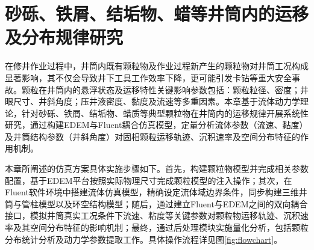 \chapter{ 砂砾、铁屑、结垢物、蜡等井筒内的运移及分布规律研究}

在修井作业过程中，井筒内既有颗粒物及作业过程新产生的颗粒物对井筒工况构成显著影响，其不仅会导致井下工具工作效率下降，更可能引发卡钻等重大安全事故。颗粒在井筒内的悬浮状态及运移特性关键影响参数包括：颗粒粒径、密度；井眼尺寸、井斜角度；压井液密度、黏度及流速等多重因素。本章基于流体动力学理论，针对砂砾、铁屑、结垢物、蜡质等典型颗粒物在井筒内的运移规律开展系统性研究，通过构建EDEM与Fluent耦合仿真模型，定量分析流体参数（流速、黏度）及井筒结构参数（井斜角度）对固相颗粒运移轨迹、沉积速率及空间分布特征的作用机制。

本章所阐述的仿真方案具体实施步骤如下。首先，构建颗粒物模型并完成相关参数配置，基于EDEM平台按照实际物理尺寸完成颗粒模型的注入操作；其次，在Fluent软件环境中搭建流体仿真模型，精确设定流体域边界条件，同步构建三维井筒与管柱模型以及环空结构模型；随后，通过建立Fluent与EDEM之间的双向耦合接口，模拟井筒真实工况条件下流速、粘度等关键参数对颗粒物运移轨迹、沉积速率及其空间分布特征的影响机制；最终，通过后处理模块实施量化分析，包括颗粒分布统计分析及动力学参数提取工作。具体操作流程详见图\ref{fig:flowchart}。


